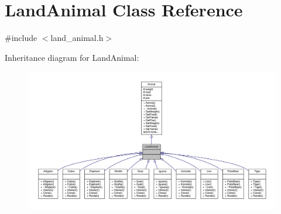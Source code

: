 \hypertarget{classLandAnimal}{}\section{Land\+Animal Class Reference}
\label{classLandAnimal}


{\ttfamily \#include $<$land\+\_\+animal.\+h$>$}



Inheritance diagram for Land\+Animal\+:
\nopagebreak
\begin{figure}[H]
\begin{center}
\leavevmode
\includegraphics[width=350pt]{classLandAnimal__inherit__graph}
\end{center}
\end{figure}


